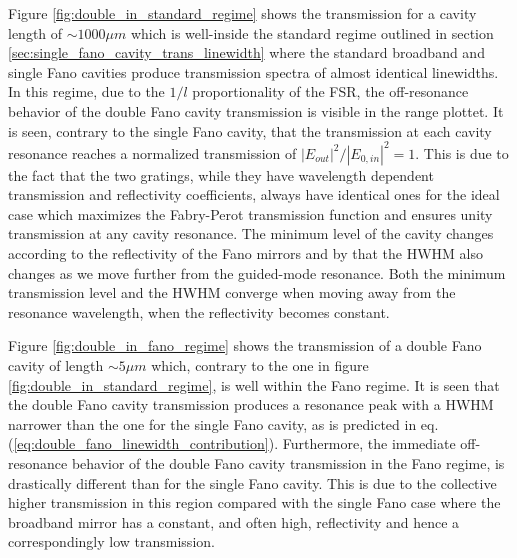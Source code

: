 Figure \ref{fig:double_in_standard_regime} shows the transmission for a cavity length of $\sim 1000 \mu m$ which is well-inside the standard regime outlined in section \ref{sec:single_fano_cavity_trans_linewidth} where the standard broadband and single Fano cavities produce transmission spectra of almost identical linewidths. In this regime, due to the $1/l$ proportionality of the FSR, the off-resonance behavior of the double Fano cavity transmission is visible in the range plottet. It is seen, contrary to the single Fano cavity, that the transmission at each cavity resonance reaches a normalized transmission of $|E_{out}|^2/|E_{0,in}|^2=1$. This is due to the fact that the two gratings, while they have wavelength dependent transmission and reflectivity coefficients, always have identical ones for the ideal case which maximizes the Fabry-Perot transmission function and ensures unity transmission at any cavity resonance. The minimum level of the cavity changes according to the reflectivity of the Fano mirrors and by that the HWHM also changes as we move further from the guided-mode resonance. Both the minimum transmission level and the HWHM converge when moving away from the resonance wavelength, when the reflectivity becomes constant. 

Figure \ref{fig:double_in_fano_regime} shows the transmission of a double Fano cavity of length $\sim 5 \mu m$ which, contrary to the one in figure \ref{fig:double_in_standard_regime}, is well within the Fano regime. It is seen that the double Fano cavity transmission produces a resonance peak with a HWHM narrower than the one for the single Fano cavity, as is predicted in eq. (\ref{eq:double_fano_linewidth_contribution}). Furthermore, the immediate off-resonance behavior of the double Fano cavity transmission in the Fano regime, is drastically different than for the single Fano cavity. This is due to the collective higher transmission in this region compared with the single Fano case where the broadband mirror has a constant, and often high, reflectivity and hence a correspondingly low transmission.

